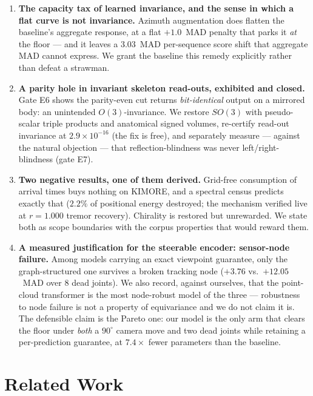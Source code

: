\documentclass[10pt,journal]{IEEEtran}
\begin{document}
\begin{enumerate}
\item \textbf{The capacity tax of learned invariance, and the sense in which a flat curve is not invariance.} Azimuth augmentation does flatten the baseline's aggregate response, at a flat $+1.0$~MAD penalty that parks it \emph{at} the floor --- and it leaves a $3.03$~MAD per-sequence score shift that aggregate MAD cannot express. We grant the baseline this remedy explicitly rather than defeat a strawman.

\item \textbf{A parity hole in invariant skeleton read-outs, exhibited and closed.} Gate E6 shows the parity-even cut returns \emph{bit-identical} output on a mirrored body: an unintended $O(3)$-invariance. We restore $SO(3)$ with pseudo-scalar triple products and anatomical signed volumes, re-certify read-out invariance at $2.9\times10^{-16}$ (the fix is free), and separately measure --- against the natural objection --- that reflection-blindness was never left/right-blindness (gate E7).

\item \textbf{Two negative results, one of them derived.} Grid-free consumption of arrival times buys nothing on KIMORE, and a spectral census predicts exactly that ($2.2\%$ of positional energy destroyed; the mechanism verified live at $r=1.000$ tremor recovery). Chirality is restored but unrewarded. We state both as scope boundaries with the corpus properties that would reward them.

\item \textbf{A measured justification for the steerable encoder: sensor-node failure.} Among models carrying an exact viewpoint guarantee, only the graph-structured one survives a broken tracking node ($+3.76$ vs.\ $+12.05$~MAD over $8$ dead joints). We also record, against ourselves, that the point-cloud transformer is the most node-robust model of the three --- robustness to node failure is not a property of equivariance and we do not claim it is. The defensible claim is the Pareto one: our model is the only arm that clears the floor under \emph{both} a $90^\circ$ camera move and two dead joints while retaining a per-prediction guarantee, at $7.4\times$ fewer parameters than the baseline.
\end{enumerate}

\section{Related Work}
\label{sec:related}
\end{document}
